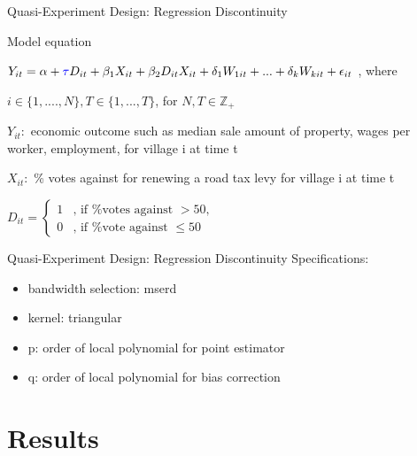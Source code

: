 \documentclass{beamer}
\begin{document}
\begin{frame}{Quasi-Experiment Design: Regression Discontinuity}\vspace{3pt}
\begin{block}{Model equation}

{\normalsize $Y_{it} = \alpha + \textcolor{blue}{\tau} D_{it} + \beta_1 X_{it} + \beta_2 D_{it} X_{it} + \delta_1 W_{1it} + ... + \delta_k W_{kit} + \epsilon_{it}$}  , where

$i \in \{1 , ...., N \}, T \in \{1, ... , T \}$, for $N, T \in \mathbb{Z}_+$ 

$Y_{it} :$ economic outcome such as median sale amount of property, wages per worker, employment, for village i at time t 

$X_{it} :$ \% votes against for renewing a road tax levy for village i at time t  

$
D_{it}=\begin{cases} 1  &\text{, if \% votes against }  > 50 ,\\ 0 &\text{, if \% vote against }  \le 50 \end{cases}
$  



\end{block}
\end{frame}

\begin{frame}[t]{Quasi-Experiment Design: Regression Discontinuity}\vspace{10pt}
Specifications: 

\begin{itemize}
    \item bandwidth selection: mserd 
    \item kernel: triangular
    \item p: order of local polynomial for point estimator
    \item q: order of local polynomial for bias correction
\end{itemize}

\end{frame}

\section{Results}
\end{document}
